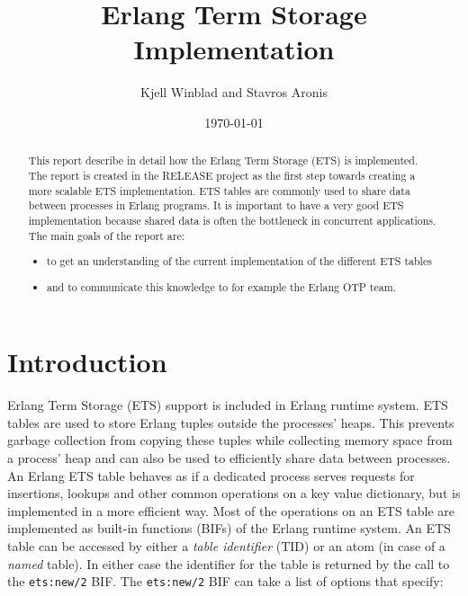 \documentclass[aps,pre,preprint,nofootinbib]{revtex4}
\begin{document}
\title{Erlang Term Storage Implementation}
\author{Kjell Winblad and Stavros Aronis}
\date{\today}


\begin{abstract}

  This report describe in detail how the Erlang Term Storage (ETS) is implemented.
  The report is created in the RELEASE project as the first step towards creating a more scalable ETS implementation.
  ETS tables are commonly used to share data between processes in Erlang programs.
  It is important to have a very good ETS implementation because shared data is often the bottleneck in concurrent applications.
  The main goals of the report are:
  \begin{itemize}
   \item to get an understanding of the current implementation of the different ETS tables
   \item and to communicate this knowledge to for example the Erlang OTP team. 
  \end{itemize}

\end{abstract}

\maketitle

\section{Introduction}

Erlang Term Storage (ETS) support is included in Erlang runtime system.
ETS tables are used to store Erlang tuples outside the processes' heaps.
This prevents garbage collection from copying these tuples while collecting memory space from a process' heap and can also be used to efficiently share data between processes. %
An Erlang ETS table behaves as if a dedicated process serves requests for insertions, lookups and other common operations on a key value dictionary, but is implemented in a more efficient way.
Most of the operations on an ETS table are implemented as built-in functions (BIFs) of the Erlang runtime system. 
An ETS table can be accessed by either a \emph{table identifier} (TID) or an atom (in case of a \emph{named} table).
In either case the identifier for the table is returned by the call to the \verb|ets:new/2| BIF.
The \verb|ets:new/2| BIF can take a list of options that specify: 
\end{document}
